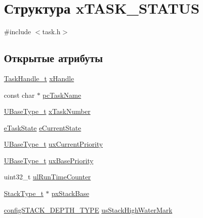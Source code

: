 \hypertarget{structx_t_a_s_k___s_t_a_t_u_s}{}\section{Структура x\+T\+A\+S\+K\+\_\+\+S\+T\+A\+T\+US}
\label{structx_t_a_s_k___s_t_a_t_u_s}


{\ttfamily \#include $<$task.\+h$>$}

\subsection*{Открытые атрибуты}
\begin{DoxyCompactItemize}
\item 
\mbox{\hyperlink{task_8h_a25b35e6e19ecf894173e7ff95edb96ef}{Task\+Handle\+\_\+t}} \mbox{\hyperlink{structx_t_a_s_k___s_t_a_t_u_s_ac57f825f365c3c64bba827285fe3c2a0}{x\+Handle}}
\item 
const char $\ast$ \mbox{\hyperlink{structx_t_a_s_k___s_t_a_t_u_s_ad272663e2560bd9ea088384a39ba6192}{pc\+Task\+Name}}
\item 
\mbox{\hyperlink{portmacro_8h_a646f89d4298e4f5afd522202b11cb2e6}{U\+Base\+Type\+\_\+t}} \mbox{\hyperlink{structx_t_a_s_k___s_t_a_t_u_s_acd44468ba37270b04f83d0833c098057}{x\+Task\+Number}}
\item 
\mbox{\hyperlink{task_8h_a1749369458e2282a22e862a619a3892c}{e\+Task\+State}} \mbox{\hyperlink{structx_t_a_s_k___s_t_a_t_u_s_a727e904e3afe49472b0fc6a4e96439cb}{e\+Current\+State}}
\item 
\mbox{\hyperlink{portmacro_8h_a646f89d4298e4f5afd522202b11cb2e6}{U\+Base\+Type\+\_\+t}} \mbox{\hyperlink{structx_t_a_s_k___s_t_a_t_u_s_a39df647234fc0d6de5852042a2741a94}{ux\+Current\+Priority}}
\item 
\mbox{\hyperlink{portmacro_8h_a646f89d4298e4f5afd522202b11cb2e6}{U\+Base\+Type\+\_\+t}} \mbox{\hyperlink{structx_t_a_s_k___s_t_a_t_u_s_a692f4c8957b7270f1579cdee63ff287e}{ux\+Base\+Priority}}
\item 
uint32\+\_\+t \mbox{\hyperlink{structx_t_a_s_k___s_t_a_t_u_s_a92ab83f4f376c255dedf8e06a78261f7}{ul\+Run\+Time\+Counter}}
\item 
\mbox{\hyperlink{portmacro_8h_a84e9a8ba132feed0b2401c1f4e2ac63c}{Stack\+Type\+\_\+t}} $\ast$ \mbox{\hyperlink{structx_t_a_s_k___s_t_a_t_u_s_a0ee59674d2cc57d3a5a29c777d5452ed}{px\+Stack\+Base}}
\item 
\mbox{\hyperlink{_free_r_t_o_s_8h_ae4e85bffd36d76cf2796092f0ccd784a}{config\+S\+T\+A\+C\+K\+\_\+\+D\+E\+P\+T\+H\+\_\+\+T\+Y\+PE}} \mbox{\hyperlink{structx_t_a_s_k___s_t_a_t_u_s_aaad57afd4a629d2404e1cff97891c571}{us\+Stack\+High\+Water\+Mark}}
\end{DoxyCompactItemize}


